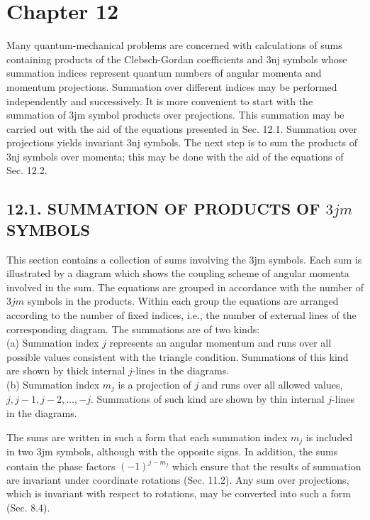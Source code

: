 \maketitle
\captionsetup{singlelinecheck=false}
\section*{Chapter 12}
Many quantum-mechanical problems are concerned with calculations of sums containing products of the Clebsch-Gordan coefficients and 3nj symbols whose summation indices represent quantum numbers of angular momenta and momentum projections. Summation over different indices may be performed independently and successively. It is more convenient to start with the summation of 3jm symbol products over projections. This summation may be carried out with the aid of the equations presented in Sec. 12.1. Summation over projections yields invariant 3nj symbols. The next step is to sum the products of 3nj symbols over momenta; this may be done with the aid of the equations of Sec. 12.2.

\subsection*{12.1. SUMMATION OF PRODUCTS OF $3 j m$ SYMBOLS}
This section contains a collection of sums involving the 3jm symbols. Each sum is illustrated by a diagram which shows the coupling scheme of angular momenta involved in the sum. The equations are grouped in accordance with the number of $3 j m$ symbols in the products. Within each group the equations are arranged according to the number of fixed indices, i.e., the number of external lines of the corresponding diagram. The summations are of two kinds:\\
(a) Summation index $j$ represents an angular momentum and runs over all possible values consistent with the triangle condition. Summations of this kind are shown by thick internal $j$-lines in the diagrams.\\
(b) Summation index $m_{j}$ is a projection of $j$ and runs over all allowed values, $j, j-1, j-2, \ldots,-j$. Summations of such kind are shown by thin internal $j$-lines in the diagrams.

The sums are written in such a form that each summation index $m_{j}$ is included in two 3jm symbols, although with the opposite signs. In addition, the sums contain the phase factors $(-1)^{j-m_{j}}$ which ensure that the results of summation are invariant under coordinate rotations (Sec. 11.2). Any sum over projections, which is invariant with respect to rotations, may be converted into such a form (Sec. 8.4).

